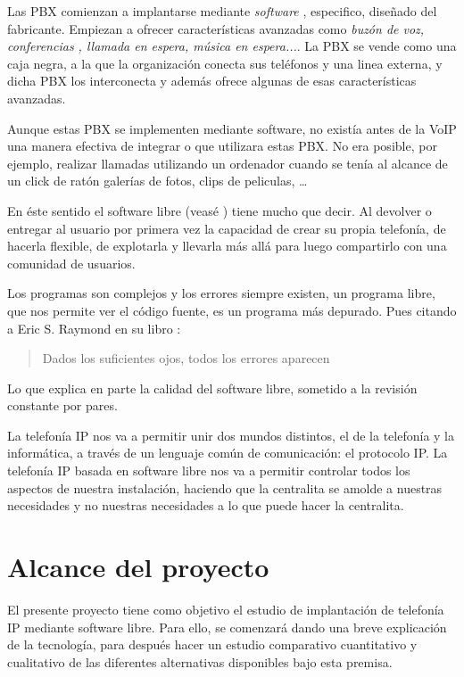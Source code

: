 \documentclass{scrartcl}
\begin{document}
Las PBX comienzan a implantarse mediante \emph{software} , especifico, diseñado del fabricante. Empiezan a ofrecer características avanzadas como \emph{buzón de voz, conferencias , llamada en espera, música en espera...}. La PBX se vende como una caja negra, a la que la organización conecta sus teléfonos y una linea externa, y dicha PBX los interconecta y además ofrece algunas de esas características avanzadas. 

Aunque estas PBX se implementen mediante software, no existía antes de la VoIP una manera efectiva de integrar o que utilizara estas PBX. No era posible, por ejemplo, realizar llamadas utilizando un ordenador cuando se tenía al alcance de un click de ratón galerías de fotos, clips de peliculas, \ldots

En éste sentido el software libre (veasé \cite{stallman-sl}) tiene mucho que decir. Al devolver o entregar al usuario por primera vez la capacidad de crear su propia telefonía, de hacerla flexible, de explotarla y llevarla más allá para luego compartirlo con una comunidad de usuarios.

Los programas son complejos y los errores siempre existen, un programa libre, que nos permite ver el código fuente, es un programa más depurado. Pues citando a Eric S. Raymond en su libro \cite{cathedral-y-bazaar}:
\begin{quotation}
  Dados los suficientes ojos, todos los errores aparecen
\end{quotation}

Lo que explica en parte la calidad del software libre, sometido a la revisión constante por pares.

La telefonía IP nos va a permitir unir dos mundos distintos, el de la telefonía y la informática, a través de un lenguaje común de comunicación: el protocolo IP. La telefonía IP basada en software libre nos va a permitir controlar todos los aspectos de nuestra instalación, haciendo que la centralita se amolde a nuestras necesidades y no nuestras necesidades a lo que puede hacer la centralita.

\section{Alcance del proyecto}

El presente proyecto tiene como objetivo el estudio de implantación de telefonía IP mediante software libre. Para ello, se comenzará dando una breve explicación de la tecnología, para después hacer un estudio comparativo cuantitativo y cualitativo de las diferentes alternativas disponibles bajo esta premisa.
\end{document}
